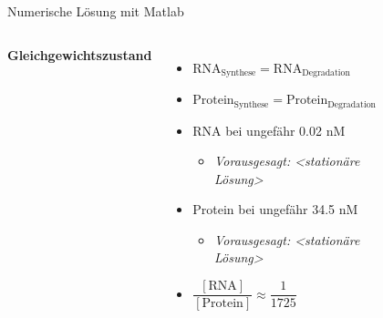 \documentclass[11pt,aspectratio=169,reqno]{beamer}
\begin{document}
\begin{frame}{Numerische Lösung mit Matlab}
    \begin{columns}
            \textbf{Gleichgewichtszustand}\\[1em]
            
            \begin{itemize}
                \item $\text{RNA}_\text{Synthese}=\text{RNA}_\text{Degradation}$
                \item $\text{Protein}_\text{Synthese}=\text{Protein}_\text{Degradation}$
                \vspace{1em}
                \item RNA bei ungefähr 0.02 nM
                \begin{itemize}
                    \item \emph{\tiny Vorausgesagt: <stationäre Lösung>}
                \end{itemize}
                \item Protein bei ungefähr 34.5 nM
                \begin{itemize}
                    \item \emph{\tiny Vorausgesagt: <stationäre Lösung>}
                \end{itemize}

                \item $\dfrac{[\text{RNA}]}{[\text{Protein}]}\approx \dfrac{1}{1725}$
            \end{itemize}
        
        \begin{figure}
            \centering
            \includegraphics[width=\linewidth]{images/negative_autoregulation_basic.m.png}
        \end{figure}
    \end{columns}
\end{frame}
\end{document}
